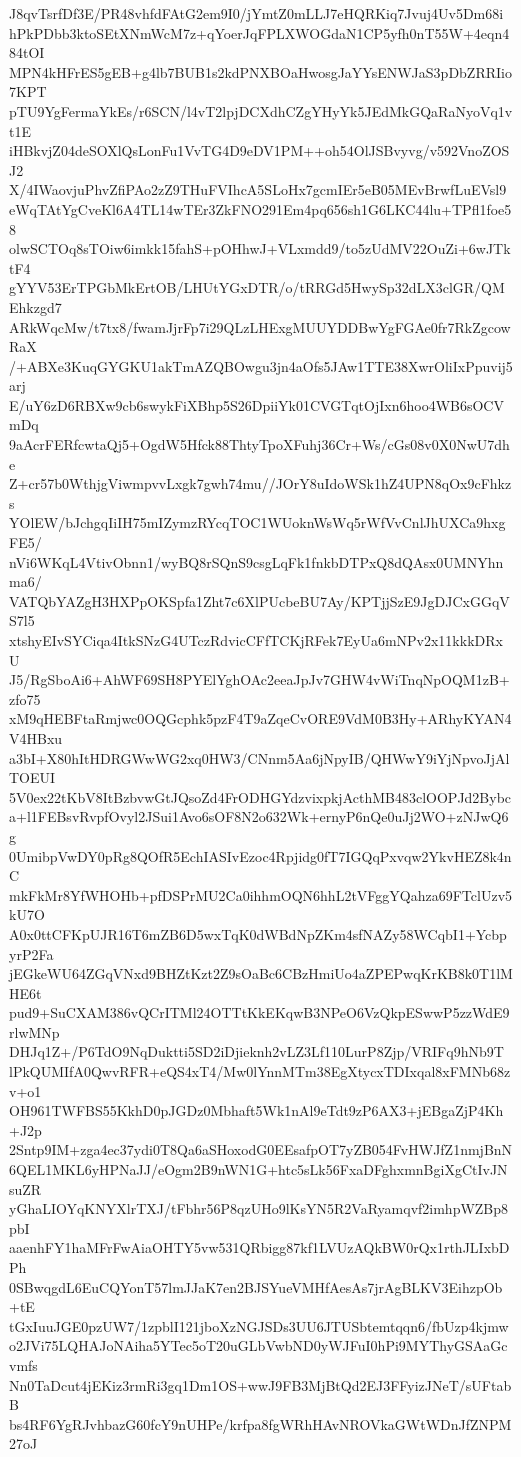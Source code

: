 J8qvTsrfDf3E/PR48vhfdFAtG2em9I0/jYmtZ0mLLJ7eHQRKiq7Jvuj4Uv5Dm68i
hPkPDbb3ktoSEtXNmWcM7z+qYoerJqFPLXWOGdaN1CP5yfh0nT55W+4eqn484tOI
MPN4kHFrES5gEB+g4lb7BUB1s2kdPNXBOaHwosgJaYYsENWJaS3pDbZRRIio7KPT
pTU9YgFermaYkEs/r6SCN/l4vT2lpjDCXdhCZgYHyYk5JEdMkGQaRaNyoVq1vt1E
iHBkvjZ04deSOXlQsLonFu1VvTG4D9eDV1PM++oh54OlJSBvyvg/v592VnoZOSJ2
X/4IWaovjuPhvZfiPAo2zZ9THuFVIhcA5SLoHx7gcmIEr5eB05MEvBrwfLuEVsl9
eWqTAtYgCveKl6A4TL14wTEr3ZkFNO291Em4pq656sh1G6LKC44lu+TPfl1foe58
olwSCTOq8sTOiw6imkk15fahS+pOHhwJ+VLxmdd9/to5zUdMV22OuZi+6wJTktF4
gYYV53ErTPGbMkErtOB/LHUtYGxDTR/o/tRRGd5HwySp32dLX3clGR/QMEhkzgd7
ARkWqcMw/t7tx8/fwamJjrFp7i29QLzLHExgMUUYDDBwYgFGAe0fr7RkZgcowRaX
/+ABXe3KuqGYGKU1akTmAZQBOwgu3jn4aOfs5JAw1TTE38XwrOliIxPpuvij5arj
E/uY6zD6RBXw9cb6swykFiXBhp5S26DpiiYk01CVGTqtOjIxn6hoo4WB6sOCVmDq
9aAcrFERfcwtaQj5+OgdW5Hfck88ThtyTpoXFuhj36Cr+Ws/cGs08v0X0NwU7dhe
Z+cr57b0WthjgViwmpvvLxgk7gwh74mu//JOrY8uIdoWSk1hZ4UPN8qOx9cFhkzs
YOlEW/bJchgqIiIH75mIZymzRYcqTOC1WUoknWsWq5rWfVvCnlJhUXCa9hxgFE5/
nVi6WKqL4VtivObnn1/wyBQ8rSQnS9csgLqFk1fnkbDTPxQ8dQAsx0UMNYhnma6/
VATQbYAZgH3HXPpOKSpfa1Zht7c6XlPUcbeBU7Ay/KPTjjSzE9JgDJCxGGqVS7l5
xtshyEIvSYCiqa4ItkSNzG4UTczRdvicCFfTCKjRFek7EyUa6mNPv2x11kkkDRxU
J5/RgSboAi6+AhWF69SH8PYElYghOAc2eeaJpJv7GHW4vWiTnqNpOQM1zB+zfo75
xM9qHEBFtaRmjwc0OQGcphk5pzF4T9aZqeCvORE9VdM0B3Hy+ARhyKYAN4V4HBxu
a3bI+X80hItHDRGWwWG2xq0HW3/CNnm5Aa6jNpyIB/QHWwY9iYjNpvoJjAlTOEUI
5V0ex22tKbV8ItBzbvwGtJQsoZd4FrODHGYdzvixpkjActhMB483clOOPJd2Bybc
a+l1FEBsvRvpfOvyl2JSui1Avo6sOF8N2o632Wk+ernyP6nQe0uJj2WO+zNJwQ6g
0UmibpVwDY0pRg8QOfR5EchIASIvEzoc4Rpjidg0fT7IGQqPxvqw2YkvHEZ8k4nC
mkFkMr8YfWHOHb+pfDSPrMU2Ca0ihhmOQN6hhL2tVFggYQahza69FTclUzv5kU7O
A0x0ttCFKpUJR16T6mZB6D5wxTqK0dWBdNpZKm4sfNAZy58WCqbI1+YcbpyrP2Fa
jEGkeWU64ZGqVNxd9BHZtKzt2Z9sOaBc6CBzHmiUo4aZPEPwqKrKB8k0T1lMHE6t
pud9+SuCXAM386vQCrITMl24OTTtKkEKqwB3NPeO6VzQkpESwwP5zzWdE9rlwMNp
DHJq1Z+/P6TdO9NqDuktti5SD2iDjieknh2vLZ3Lf110LurP8Zjp/VRIFq9hNb9T
lPkQUMIfA0QwvRFR+eQS4xT4/Mw0lYnnMTm38EgXtycxTDIxqal8xFMNb68zv+o1
OH961TWFBS55KkhD0pJGDz0Mbhaft5Wk1nAl9eTdt9zP6AX3+jEBgaZjP4Kh+J2p
2Sntp9IM+zga4ec37ydi0T8Qa6aSHoxodG0EEsafpOT7yZB054FvHWJfZ1nmjBnN
6QEL1MKL6yHPNaJJ/eOgm2B9nWN1G+htc5sLk56FxaDFghxmnBgiXgCtIvJNsuZR
yGhaLIOYqKNYXlrTXJ/tFbhr56P8qzUHo9lKsYN5R2VaRyamqvf2imhpWZBp8pbI
aaenhFY1haMFrFwAiaOHTY5vw531QRbigg87kf1LVUzAQkBW0rQx1rthJLIxbDPh
0SBwqgdL6EuCQYonT57lmJJaK7en2BJSYueVMHfAesAs7jrAgBLKV3EihzpOb+tE
tGxIuuJGE0pzUW7/1zpblI121jboXzNGJSDs3UU6JTUSbtemtqqn6/fbUzp4kjmw
o2JVi75LQHAJoNAiha5YTec5oT20uGLbVwbND0yWJFuI0hPi9MYThyGSAaGcvmfs
Nn0TaDcut4jEKiz3rmRi3gq1Dm1OS+wwJ9FB3MjBtQd2EJ3FFyizJNeT/sUFtabB
bs4RF6YgRJvhbazG60fcY9nUHPe/krfpa8fgWRhHAvNROVkaGWtWDnJfZNPM27oJ
